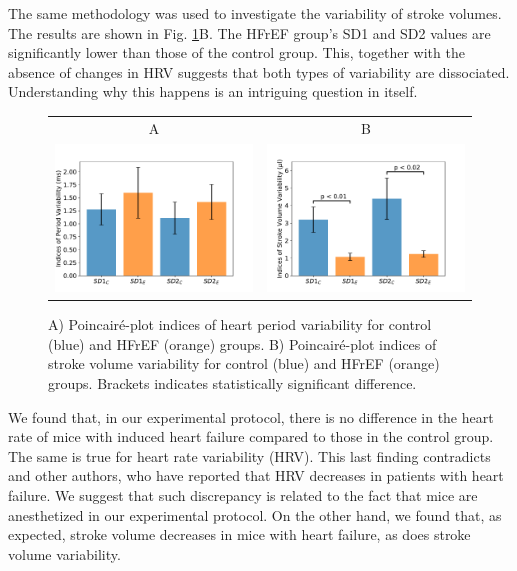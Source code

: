 \documentclass[%
preprint,
 amsmath,amssymb,
 aps,
]{revtex4-2}
\begin{document}
The same methodology was used to investigate the variability of stroke volumes. The results are shown in Fig. \ref{fig:fig02}B. The HFrEF group's SD1 and SD2 values are significantly lower than those of the control group. This, together with the absence of changes in HRV suggests that both types of variability are dissociated. Understanding why this happens is an intriguing question in itself. 

\begin{figure}[h!]
    \begin{tabular}{cc}
        A & B \\
        \includegraphics[width=3in]{Fig02_A.pdf} &
        \includegraphics[width=3in]{Fig02_B.pdf}
    \end{tabular}
    \caption{A) Poincairé-plot indices of heart period variability for control (blue) and HFrEF (orange) groups. B) Poincairé-plot indices of stroke volume variability for control (blue) and HFrEF (orange) groups. Brackets indicates statistically significant difference.}
    \label{fig:fig02}
\end{figure}


We found that, in our experimental protocol, there is no difference in the heart rate of mice with induced heart failure compared to those in the control group. The same is true for heart rate variability (HRV). This last finding contradicts \citet{Kamen_1995} and other authors, who have reported that HRV decreases in patients with heart failure. We suggest that such discrepancy is related to the fact that mice are anesthetized in our experimental protocol. On the other hand, we found that, as expected, stroke volume decreases in mice with heart failure, as does stroke volume variability. 
\end{document}
